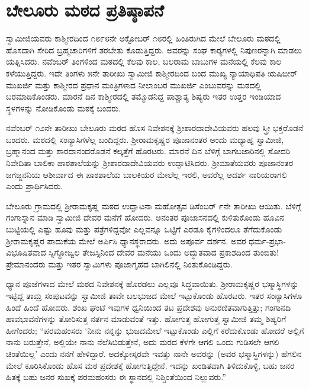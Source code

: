
\chapter{ಬೇಲೂರು ಮಠದ ಪ್ರತಿಷ್ಠಾಪನೆ}

 ಸ್ವಾಮೀಜಿಯವರು ಕಾಶ್ಮೀರದಿಂದ ೧೮೯೮ನೇ ಅಕ್ಟೋಬರ್ ೧೮ರಲ್ಲಿ ಹಿಂತಿರುಗಿದ ಮೇಲೆ ಬೇಲೂರು ಮಠದಲ್ಲಿ ಹೊಸದಾಗಿ ಸೇರಿದ ಬ್ರಹ್ಮಚಾರಿಗಳಿಗೆ ತರಬೇತು ಕೊಡುತ್ತಿದ್ದರು. ಅವರನ್ನು ಸಂಘ ಕಾರ‍್ಯಗಳಲ್ಲಿ ನಿಪುಣರನ್ನಾಗಿ ಮಾಡಲು ಯತ್ನಿಸಿದರು. ನವೆಂಬರ್ ತಿಂಗಳಿಂದ ಮಠದಲ್ಲಿ ಕೆಲವು ಕಾಲ, ಬಲರಾಮ ಬಾಬುಗಳ ಮನೆಯಲ್ಲಿ ಕೆಲವು ಕಾಲ ಕಳೆಯುತ್ತಿದ್ದರು. ಇದೇ ತಿಂಗಳು ೫ನೇ ತಾರೀಖು ಸ್ವಾಮೀಜಿ ಕಾಶ್ಮೀರದಿಂದ ಬಂದ ಮುಖ್ಯ ನ್ಯಾಯಾಧಿಪತಿ ಋಷಿಬೀರ್ ಮುಖರ್ಜಿ ಮತ್ತು ಕಾಶ್ಮೀರದ ಪ್ರಧಾನ ಮಂತ್ರಿಗಳಾದ ನೀಲಾಂಬರ ಮುಖರ್ಜಿ ಎಂಬುವರನ್ನು ಮಠದಲ್ಲಿ ಬರಮಾಡಿಕೊಂಡರು. ಮಾರನೆ ದಿನ ಕಾಶ್ಮೀರದಲ್ಲಿ ತಮ್ಮೊಡನಿದ್ದ ಪಾಶ್ಚಾತ್ಯ ಶಿಷ್ಯರು ಇತರ ಉತ್ತರ ಇಂಡಿಯಾದ ಸ್ಥಳಗಳನ್ನು ನೋಡಿಕೊಂಡು ಮಠಕ್ಕೆ ಬಂದರು. 

\vskip 2pt

 ನವೆಂಬರ್ ೧೨ನೇ ತಾರೀಖು ಬೇಲೂರು ಮಠದ ಹೊಸ ನಿವೇಶನಕ್ಕೆ ಶ‍್ರೀಶಾರದಾದೇವಿ\-ಯವರು ಹಲವು ಸ್ತ್ರೀ ಭಕ್ತರೊಡನೆ ಬಂದರು. ಮಠದಲ್ಲಿ ಸಂನ್ಯಾಸಿಗಳೆಲ್ಲ ಬಂದಿದ್ದರು. ಶ‍್ರೀರಾಮಕೃಷ್ಣರ ಪೂಜಾನಂತರ ಅಂದು ಮಧ್ಯಾಹ್ನ ಸ್ವಾಮೀಜಿ, ಬ್ರಹ್ಮಾನಂದ ಮತ್ತು ಶಾರದಾನಂದರೊಡನೆ ಕಲ್ಕತ್ತೆಗೆ ಹೊರಟರು. ಮಾರನೆ ದಿನ ಬೆಳಿಗ್ಗೆ ಬಾಗಬಜಾರಿನಲ್ಲಿ ಸೋದರಿ ನಿವೇದಿತಾ ಬಾಲಿಕಾ ಪಾಠಶಾಲೆಯನ್ನು ಶ‍್ರೀಶಾರದಾದೇವಿಯವರು ಉದ್ಘಾಟಿಸಿದರು. ಶ‍್ರೀಮಾತೆಯವರು ಪೂಜಾನಂತರ ಜಗಜ್ಜನನಿಯ ಆಶೀರ್ವಾದ ಈ ಪಾಠಶಾಲೆಯ ಬಾಲಕಿಯರ ಮೇಲೆಲ್ಲ ಇರಲಿ, ಅವರೆಲ್ಲ ಆದರ್ಶ ನಾರಿಯರಾಗಲಿ ಎಂದು ಪ್ರಾರ್ಥಿಸಿದರು. 

\vskip 2pt

 ಬೇಲೂರು ಗ್ರಾಮದಲ್ಲಿ ಶ‍್ರೀರಾಮಕೃಷ್ಣ ಮಠದ ಉದ್ಘಾಟನಾ ಮಹೋತ್ಸವ ಡಿಸೆಂಬರ್ ೯ನೇ ತಾರೀಖು ಆಯಿತು. ಬೆಳಿಗ್ಗೆ ಗಂಗಾಸ್ನಾನ ಮಾಡಿ ಸ್ವಾಮೀಜಿ ದೇವರ ಮನೆಗೆ ಹೋದರು. ಅನಂತರ ಪೂಜಾಸನದಲ್ಲಿ ಕುಳಿತುಕೊಂಡು ಹೂವಿನ ಬುಟ್ಟಿಯಲ್ಲಿ ಎಷ್ಟು ಹೂವು ಮತ್ತು ಪತ್ರೆಗಳಿದ್ದವೋ ಎಲ್ಲವನ್ನೂ ಒಟ್ಟಿಗೆ ಎರಡೂ ಕೈಗಳಿಂದಲೂ ತೆಗೆದುಕೊಂಡು ಶ‍್ರೀರಾಮಕೃಷ್ಣರ ಪಾದುಕೆಯ ಮೇಲೆ ಅರ್ಪಿಸಿ ಧ್ಯಾನಸ್ಥರಾದರು. ಅದು ಅಪೂರ್ವ ದರ್ಶನ. ಅವರ ಧರ್ಮ-ಪ್ರಭಾ-ವಿಭೂಷಿತವಾದ ಸ್ನಿಗ್ಧೋಜ್ವಲ ತೇಜಸ್ಸಿನಿಂದ ದೇವರ ಮನೆಯು ಒಂದು ಅದ್ಭುತವಾದ ಪ್ರಕಾಶದಿಂದ ತುಂಬಿತು! ಪ್ರೇಮಾನಂದರು ಮತ್ತು ಇತರ ಸ್ವಾಮಿಗಳು ಪೂಜಾಗೃಹದ ಬಾಗಿಲಿನಲ್ಲಿ ನಿಂತುಕೊಂಡಿದ್ದರು. 

\vskip 2pt

 ಧ್ಯಾನ ಪೂಜೆಗಳಾದ ಮೇಲೆ ಮಠದ ನಿವೇಶನಕ್ಕೆ ಹೊರಡಲು ಎಲ್ಲವೂ ಸಿದ್ಧವಾಯಿತು. ಶ‍್ರೀರಾಮಕೃಷ್ಣರ ಭಸ್ಮಾಸ್ಥಿಗಳನ್ನು ಇಟ್ಟಿದ್ದ ತಾಮ್ರ ಸಂಪುಟವನ್ನು ಸ್ವಾಮೀಜಿ ತಾವೇ ಬಲಭುಜದ ಮೇಲೆ ಇಟ್ಟುಕೊಂಡು ಹೊರಟರು. ಇತರ ಸಂನ್ಯಾಸಿಗಳೂ ಹಿಂದೆ ಹಿಂದೆ ಹೋದರು. ಶಂಖ ಘಂಟೆ ಇವುಗಳ ಧ್ವನಿಯಿಂದ ತಟ ಪ್ರದೇಶವು ಅನುರಣಿತವಾಗುತ್ತಿತ್ತು; ಗಂಗಾನದಿ ಹಾವಭಾವನೆಗಳನ್ನು ತೋರಿಸುತ್ತ ನರ್ತನ ಮಾಡುವಂತೆ ಇತ್ತು. ಹೋಗುತ್ತ ಹೋಗುತ್ತ ಸ್ವಾಮೀಜಿ ತಮ್ಮ ಶಿಷ್ಯರಿಗೆ ಹೀಗೆಂದರು; “ಪರಮಹಂಸರು ‘ನೀನು ನನ್ನನ್ನು ಭುಜದಮೇಲೆ ಇಟ್ಟುಕೊಂಡು ಎಲ್ಲಿಗೆ ಕರೆದುಕೊಂಡು ಹೋದರೆ ಅಲ್ಲಿಗೆ ನಾನು ಬರುತ್ತೇನೆ, ಅಲ್ಲಿಯೇ ನಾನು ನೆಲೆಸಿಬಿಡುತ್ತೇನೆ, ಅದು ಮರದ ಕೆಳಗೇ ಆಗಲಿ ಒಂದು ಗುಡಿಸಲೇ ಆಗಲಿ ಚಿಂತೆಯಿಲ್ಲ’ ಎಂದು ನನಗೆ ಹೇಳಿದ್ದಾರೆ. ಅದಕ್ಕೋಸ್ಕರವೇ ಇವತ್ತು ನಾನೇ ಅವರನ್ನು (ಅವರ ಭಸ್ಮಾಸ್ಥಿಗಳನ್ನು) ಹೆಗಲಿನ ಮೇಲೆ ಕೂರಿಸಿಕೊಂಡು ಹೊಸ ಮಠ ಪ್ರದೇಶಕ್ಕೆ ಹೋಗುತ್ತಿದ್ದೇನೆ. ಇದನ್ನು ಖಂಡಿತವಾಗಿ ತಿಳಿದುಕೊಳ್ಳಿ, ಬಹು ಜನರ ಹಿತಕ್ಕೆ ಬಹು ಜನರ ಸುಖಕ್ಕೆ ಪರಮಹಂಸರು ಈ ಸ್ಥಾನದಲ್ಲಿ ನಿಶ್ಚಿಂತೆಯಿಂದ ನಿಲ್ಲುವರು.” 

